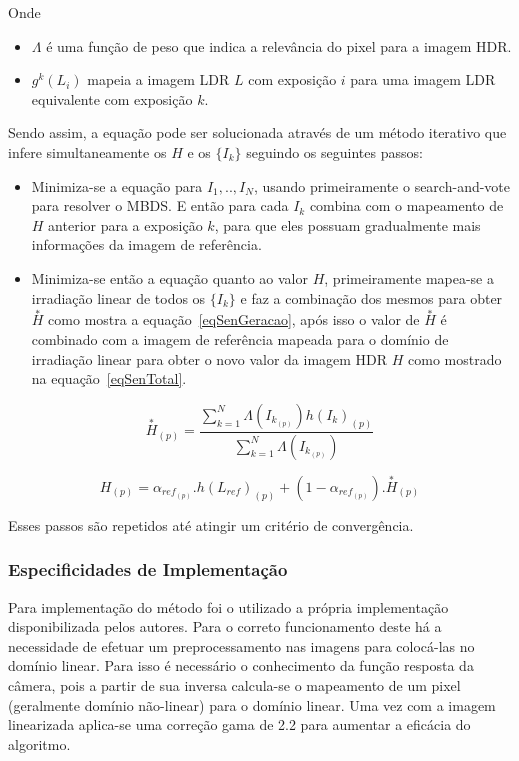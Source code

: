 Onde

\begin{itemize}
	\item $\Lambda$ é uma função de peso que indica a relevância do pixel para a imagem HDR.
	\item $g^k(L_i)$ mapeia a imagem LDR $L$ com exposição $i$ para uma imagem LDR equivalente com exposição $k$.
\end{itemize}

Sendo assim, a equação pode ser solucionada através de um método iterativo que infere simultaneamente os $H$ e os $\{I_k\}$ seguindo os seguintes passos:

\begin{itemize}
	\item Minimiza-se a equação para $I_1,..,I_N$, usando primeiramente o search-and-vote para resolver o MBDS. E então para cada $I_k$ combina com o mapeamento de $H$ anterior para a exposição $k$, para que eles possuam gradualmente mais informações da imagem de referência.
	\item Minimiza-se então a equação quanto ao valor $H$, primeiramente mapea-se a irradiação linear de todos os $\{I_k\}$ e faz a combinação dos mesmos para obter $\overset{*}{H}$ como mostra a equação~\ref{eqSenGeracao}, após isso o valor de $\overset{*}{H}$ é combinado com a imagem de referência mapeada para o domínio de irradiação linear para obter o novo valor da imagem HDR $H$ como mostrado na equação~\ref{eqSenTotal}.
\end{itemize}

\begin{equation} \label{eqSenGeracao}
	\overset{*}{H}_{(p)} = \frac{\sum\limits_{k = 1}^N{\Lambda(I_{k_{(p)}})h(I_k)_{(p)}}}{\sum\limits_{k = 1}^N{\Lambda(I_{k_{(p)}})}}
\end{equation}

\begin{equation} \label{eqSenTotal}
	H_{(p)} = \alpha_{ref_{(p)}}.h(L_{ref})_{(p)} + (1-\alpha_{ref_{(p)}}).\overset{*}{H}_{(p)}
\end{equation}

Esses passos são repetidos até atingir um critério de convergência.

\subsubsection{Especificidades de Implementação} \label{MetodoSenImplementacao}

Para implementação do método foi o utilizado a própria implementação disponibilizada pelos autores\cite{hdrMovimento}. Para o correto funcionamento deste há a necessidade de efetuar um preprocessamento nas imagens para colocá-las no domínio linear. Para isso é necessário o conhecimento da função resposta da câmera, pois a partir de sua inversa calcula-se o mapeamento de um pixel (geralmente domínio não-linear) para o domínio linear. Uma vez com a imagem linearizada aplica-se uma correção gama de 2.2 para aumentar a eficácia do algoritmo.

